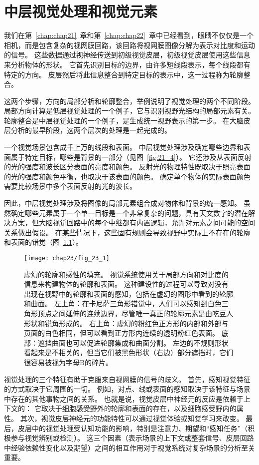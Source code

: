 \chapter{中层视觉处理和视觉元素} \label{chap:chap23}

我们在第~\ref{chap:chap21}~章和第~\ref{chap:chap22}~章中已经看到，眼睛不仅仅是一个相机，而是包含复杂的视网膜回路，该回路将视网膜图像分解为表示对比度和运动的信号。
这些数据通过视神经传送到初级视觉皮层，初级视觉皮层使用这些信息来分析物体的形状。
它首先识别目标的边界，由许多短线段表示，每个线段都有特定的方向。
皮层然后将此信息整合到特定目标的表示中，这一过程称为轮廓整合。


这两个步骤，方向的局部分析和轮廓整合，举例说明了视觉处理的两个不同阶段。
局部方向计算是低层视觉处理的一个例子，它与识别视野光结构的局部元素有关。
轮廓整合是中层视觉处理的一个例子，是生成统一视野表示的第一步。
在大脑皮层分析的最早阶段，这两个层次的处理是一起完成的。
 

一个视觉场景包含成千上万的线段和表面。
中层视觉处理涉及确定哪些边界和表面属于特定目标，哪些是背景的一部分（见图~\ref{fig:21_4}）。
它还涉及从表面反射的光的强度和波长区分表面的亮度和颜色。
反射光的物理特性既取决于照亮表面的光的强度和颜色平衡，也取决于该表面的颜色。
确定单个物体的实际表面颜色需要比较场景中多个表面反射的光的波长。


因此，中层视觉处理涉及将图像的局部元素组合成对物体和背景的统一感知。
虽然确定哪些元素属于一个单一目标是一个非常复杂的问题，具有天文数字的潜在解决方案，但大脑视觉回路中的每个中继都有内置逻辑，允许对元素之间可能的空间关系做出假设。
在某些情况下，这些固有规则会导致视野中实际上不存在的轮廓和表面的错觉（图~\ref{fig:23_1}）。


\begin{figure}[htbp]
	\centering
	\texttt{[image: chap23/fig\_23\_1]}
	\caption{虚幻的轮廓和感性的填充。
		视觉系统使用关于局部方向和对比度的信息来构建物体的轮廓和表面。
		这种建设性的过程可以导致对没有出现在视野中的轮廓和表面的感知，包括在虚幻的图形中看到的轮廓和曲面。
		左上角：在卡尼萨三角形错觉中，人们可以感知到白色三角形顶点之间延伸的连续边界，尽管唯一真正的轮廓元素是由吃豆人形状和锐角形成的。
		右上角：虚幻的粉红色正方形的内部和外部与页面的白色相同，但可以看到正方形内连续的透明粉红色表面。
		底部：遮挡曲面也可以促进轮廓集成和曲面分割。
		左边的不规则形状看起来是不相关的，但当它们被黑色形状（右边）部分遮挡时，它们很容易被视为字母B的碎片。}
	\label{fig:23_1}
\end{figure}


视觉处理的三个特征有助于克服来自视网膜的信号的歧义。
首先，感知视觉特征的方式取决于它周围的一切。
例如，对点、线或表面的感知取决于该特征与场景中存在的其他事物之间的关系。
也就是说，视觉皮层中神经元的反应是依赖于上下文的：
它取决于细胞感受野外的轮廓和表面的存在，以及细胞感受野内的属性。
其次，视觉皮层神经元的功能特性可以通过视觉体验或知觉学习来改变。
最后，皮层中的视觉处理受认知功能的影响，特别是注意力、期望和“感知任务”（积极参与视觉辨别或检测）。
这三个因素（表示场景的上下文或整套信号、皮层回路中经验依赖性变化以及期望）之间的相互作用对于视觉系统对复杂场景的分析至关重要。


